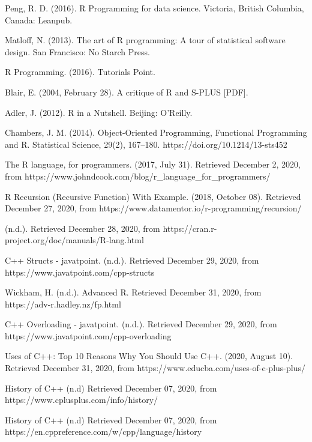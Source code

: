 \documentclass[12pt]{article}
\begin{document}
\newpage
\begin{thebibliography}{50}

Peng, R. D. (2016). R Programming for data science. Victoria, British Columbia, Canada: Leanpub.

Matloff, N. (2013). The art of R programming: A tour of statistical software design. San Francisco: No Starch Press.

R Programming. (2016). Tutorials Point.

Blair, E. (2004, February 28). A critique of R and S-PLUS [PDF].

Adler, J. (2012). R in a Nutshell. Beijing: O'Reilly.

Chambers, J. M. (2014). Object-Oriented Programming, Functional Programming and R. Statistical Science, 29(2), 167–180. https://doi.org/10.1214/13-sts452

The R language, for programmers. (2017, July 31). Retrieved December 2, 2020, from https://www.johndcook.com/blog/r\_language\_for\_programmers/

R Recursion (Recursive Function) With Example. (2018, October 08). Retrieved December 27, 2020, from https://www.datamentor.io/r-programming/recursion/

(n.d.). Retrieved December 28, 2020, from https://cran.r-project.org/doc/manuals/R-lang.html

C++ Structs - javatpoint. (n.d.). Retrieved December 29, 2020, from https://www.javatpoint.com/cpp-structs

Wickham, H. (n.d.). Advanced R. Retrieved December 31, 2020, from https://adv-r.hadley.nz/fp.html

C++ Overloading - javatpoint. (n.d.). Retrieved December 29, 2020, from https://www.javatpoint.com/cpp-overloading

Uses of C++: Top 10 Reasons Why You Should Use C++. (2020, August 10). Retrieved December 31, 2020, from https://www.educba.com/uses-of-c-plus-plus/

History of C++ (n.d) Retrieved December 07, 2020, from https://www.cplusplus.com/info/history/

History of C++ (n.d) Retrieved December 07, 2020, from https://en.cppreference.com/w/cpp/language/history


\end{thebibliography}
\end{document}
